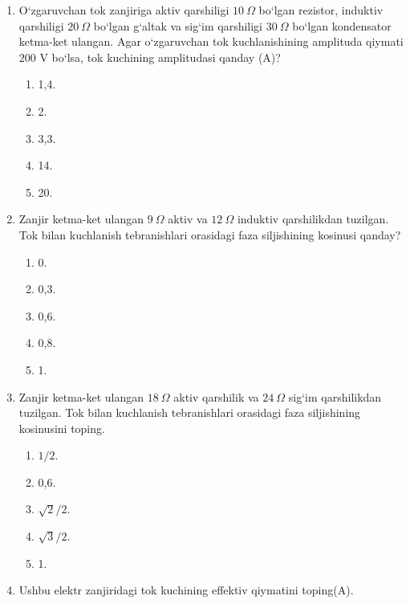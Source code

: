 \begin{enumerate}
\item O‘zgaruvchan tok zanjiriga aktiv qarshiligi $10~\Omega$ bo‘lgan rezistor, induktiv qarshiligi $20~\Omega$ bo‘lgan g‘altak va sig‘im qarshiligi $30~\Omega$ bo‘lgan kondensator ketma-ket ulangan. Agar o‘zgaruvchan tok kuchlanishining amplituda qiymati $200$ V bo‘lsa, tok kuchining amplitudasi qanday (A)?
\begin{enumerate}[label=\Alph*)]
\item 1,4.
\item 2.
\item 3,3.
\item 14.
\item 20.
\end{enumerate}

\item Zanjir ketma-ket ulangan $9~\Omega$ aktiv va $12~\Omega$ induktiv qarshilikdan tuzilgan. Tok bilan kuchlanish tebranishlari orasidagi faza siljishining kosinusi qanday?
\begin{enumerate}[label=\Alph*)]
\item 0.
\item 0,3.
\item 0,6.
\item 0,8.
\item 1.
\end{enumerate}

\item Zanjir ketma-ket ulangan $18~\Omega$ aktiv qarshilik va $24~\Omega$ sig‘im qarshilikdan tuzilgan. Tok bilan kuchlanish tebranishlari orasidagi faza siljishining kosinusini toping.
\begin{enumerate}[label=\Alph*)]
\item $1/2$.
\item 0,6.
\item $\sqrt2/2$.
\item $\sqrt3/2$.
\item 1.
\end{enumerate}

\item Ushbu elektr zanjiridagi tok kuchining effektiv qiymatini toping(A).

\end{enumerate}
